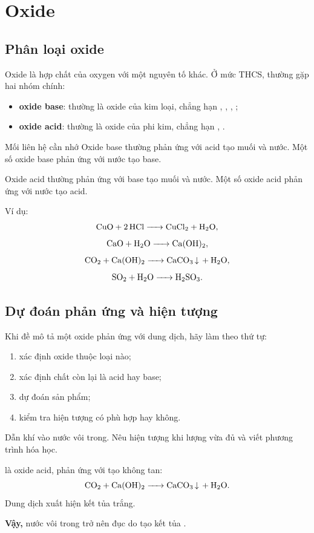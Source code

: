 \section{Oxide}

\subsection{Phân loại oxide}

Oxide là hợp chất của oxygen với một nguyên tố khác. Ở mức THCS, thường gặp hai nhóm chính:

\begin{itemize}
\item \textbf{oxide base}: thường là oxide của kim loại, chẳng hạn , , , ;
\item \textbf{oxide acid}: thường là oxide của phi kim, chẳng hạn , .
\end{itemize}

\begin{ghinho}{Mối liên hệ cần nhớ}
Oxide base thường phản ứng với acid tạo muối và nước. Một số oxide base phản ứng với nước tạo base.

Oxide acid thường phản ứng với base tạo muối và nước. Một số oxide acid phản ứng với nước tạo acid.
\end{ghinho}

Ví dụ:
\[
\ce{CuO + 2HCl -> CuCl2 + H2O},
\]
\[
\ce{CaO + H2O -> Ca(OH)2},
\]
\[
\ce{CO2 + Ca(OH)2 -> CaCO3 v + H2O},
\]
\[
\ce{SO2 + H2O -> H2SO3}.
\]

\subsection{Dự đoán phản ứng và hiện tượng}

Khi đề mô tả một oxide phản ứng với dung dịch, hãy làm theo thứ tự:
\begin{enumerate}
\item xác định oxide thuộc loại nào;
\item xác định chất còn lại là acid hay base;
\item dự đoán sản phẩm;
\item kiểm tra hiện tượng có phù hợp hay không.
\end{enumerate}

\begin{vidu}
Dẫn khí  vào nước vôi trong. Nêu hiện tượng khi lượng  vừa đủ và viết phương trình hóa học.
\end{vidu}
\begin{loigiai}
 là oxide acid, phản ứng với  tạo  không tan:
\[
\ce{CO2 + Ca(OH)2 -> CaCO3 v + H2O}.
\]
Dung dịch xuất hiện kết tủa trắng.

\textbf{Vậy,} nước vôi trong trở nên đục do tạo kết tủa .
\end{loigiai}

